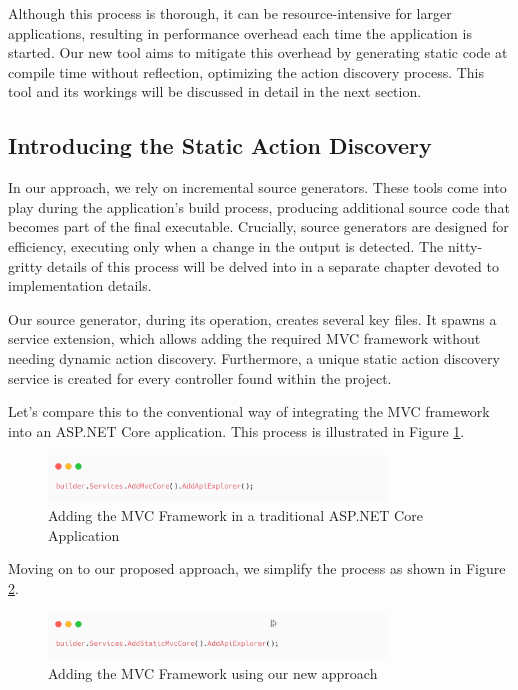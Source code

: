 Although this process is thorough, it can be resource-intensive for larger applications, resulting in performance overhead each time the application is started. Our new tool aims to mitigate this overhead by generating static code at compile time without reflection, optimizing the action discovery process. This tool and its workings will be discussed in detail in the next section.

\subsection{Introducing the Static Action Discovery}

In our approach, we rely on incremental source generators. These tools come into play during the application's build process, producing additional source code that becomes part of the final executable. Crucially, source generators are designed for efficiency, executing only when a change in the output is detected. The nitty-gritty details of this process will be delved into in a separate chapter devoted to implementation details.

Our source generator, during its operation, creates several key files. It spawns a service extension, which allows adding the required MVC framework without needing dynamic action discovery. Furthermore, a unique static action discovery service is created for every controller found within the project.

Let's compare this to the conventional way of integrating the MVC framework into an ASP.NET Core application. This process is illustrated in Figure \ref{fig:dynamic-action-discovery}.

\begin{figure}[H]
\centering
\includegraphics[width=0.8\textwidth]{graphics/dynamic-action-discovery.png}
\caption{Adding the MVC Framework in a traditional ASP.NET Core Application}
\label{fig:dynamic-action-discovery}
\end{figure}

Moving on to our proposed approach, we simplify the process as shown in Figure \ref{fig:static-action-discovery}.

\begin{figure}[H]
\centering
\includegraphics[width=0.8\textwidth]{graphics/static-action-discovery.png}
\caption{Adding the MVC Framework using our new approach}
\label{fig:static-action-discovery}
\end{figure}

